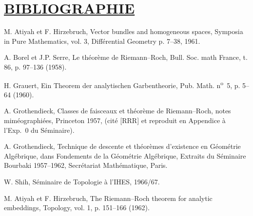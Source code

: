 \section*{\underline{BIBLIOGRAPHIE}}
\begin{enumerate}[label={[\arabic*]},leftmargin=2.5em]
\item M.
Atiyah et F. Hirzebruch, Vector bundles and homogeneous spaces, Symposia in Pure Mathematics, vol. 3, Diff\'erential Geometry p. 7--38, 1961.
\item A. Borel et J.P. Serre, Le th\'eor\`eme de Riemann--Roch, Bull. Soc. math France, t. 86, p. 97--136 (1958).
\item H. Grauert, Ein Theorem der analytischen Garbentheorie, Pub. Math. n\textsuperscript{o}~5, p. 5--64 (1960).
\item A. Grothendieck, Classes de faisceaux et th\'eor\`eme de Riemann--Roch, notes mim\'eographi\'ees, Princeton 1957, (cit\'e [RRR] et reproduit en Appendice \`a l'Exp.\ 0 du S\'eminaire).
\item A. Grothendieck, Technique de descente et th\'eor\`emes d'existence en G\'eom\'etrie Alg\'ebrique, dans Fondements de la G\'eom\'etrie Alg\'ebrique, Extraits du S\'eminaire Bourbaki 1957--1962, Secr\'etariat Math\'ematique, Paris.
\item W. Shih, S\'eminaire de Topologie \`a l'IHES, 1966/67.
\item M. Atiyah et F. Hirzebruch, The Riemann--Roch theorem for analytic embeddings, Topology, vol. 1, p. 151--166 (1962).
\end{enumerate}



\clearpage



